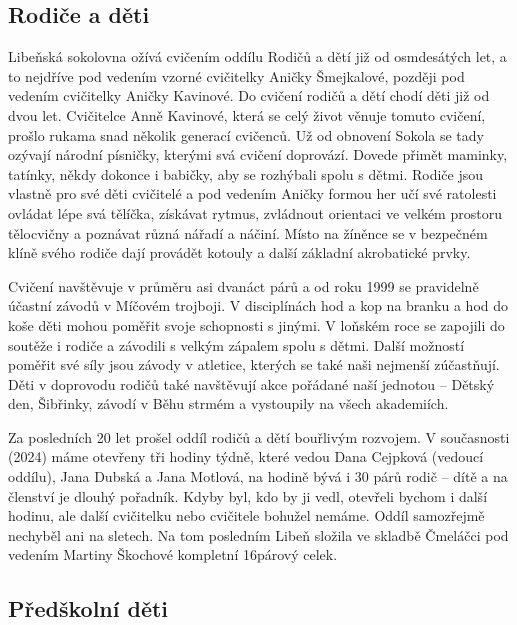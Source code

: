 \subsection{\texorpdfstring{Rodiče a děti
}{Rodiče a děti }}\label{rodiux10de-a-dux11bti}

Libeňská sokolovna ožívá cvičením oddílu Rodičů a dětí již od
osmdesátých let, a to nejdříve pod vedením vzorné cvičitelky Aničky
Šmejkalové, později pod vedením cvičitelky Aničky Kavinové. Do cvičení
rodičů a dětí chodí děti již od dvou let. Cvičitelce Anně Kavinové,
která se celý život věnuje tomuto cvičení, prošlo rukama snad několik
generací cvičenců. Už od obnovení Sokola se tady ozývají národní
písničky, kterými svá cvičení doprovází. Dovede přimět maminky, tatínky,
někdy dokonce i babičky, aby se rozhýbali spolu s dětmi. Rodiče jsou
vlastně pro své děti cvičitelé a pod vedením Aničky formou her učí své
ratolesti ovládat lépe svá tělíčka, získávat rytmus, zvládnout orientaci
ve velkém prostoru tělocvičny a poznávat různá nářadí a náčiní. Místo na
žíněnce se v bezpečném klíně svého rodiče dají provádět kotouly a další
základní akrobatické prvky.

Cvičení navštěvuje v průměru asi dvanáct párů a od roku 1999 se
pravidelně účastní závodů v Míčovém trojboji. V disciplínách hod a kop
na branku a hod do koše děti mohou poměřit svoje schopnosti s jinými. V
loňském roce se zapojili do soutěže i rodiče a závodili s velkým zápalem
spolu s dětmi. Další možností poměřit své síly jsou závody v atletice,
kterých se také naši nejmenší zúčastňují. Děti v doprovodu rodičů také
navštěvují akce pořádané naší jednotou -- Dětský den, Šibřinky, závodí v
Běhu strmém a vystoupily na všech akademiích.

Za posledních 20 let prošel oddíl rodičů a dětí bouřlivým rozvojem. V
současnosti (2024) máme otevřeny tři hodiny týdně, které vedou Dana
Cejpková (vedoucí oddílu), Jana Dubská a Jana Motlová, na hodině bývá i
30 párů rodič -- dítě a na členství je dlouhý pořadník. Kdyby byl, kdo
by ji vedl, otevřeli bychom i další hodinu, ale další cvičitelku nebo
cvičitele bohužel nemáme. Oddíl samozřejmě nechyběl ani na sletech. Na
tom posledním Libeň složila ve skladbě Čmeláčci pod vedením Martiny
Škochové kompletní 16párový celek.

\subsection{Předškolní děti}\label{pux159edux161kolnuxed-dux11bti}

